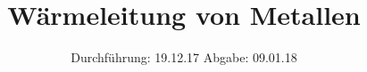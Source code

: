 

\subject{V204}
\title{Wärmeleitung von Metallen}
\date{
  Durchführung: 19.12.17
  \hspace{3em}
  Abgabe: 09.01.18
}



\maketitle
\thispagestyle{empty}
\tableofcontents
\newpage








\newpage
\printbibliography


